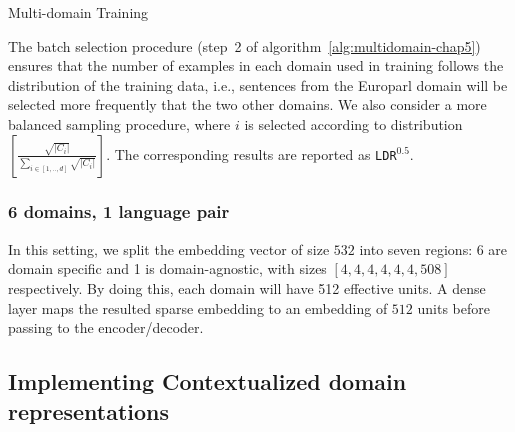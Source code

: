 \begin{algorithm}[h]
\caption{Multi-domain Training}
\label{alg:multidomain-chap5}
\begin{algorithmic}[1]
\REPEAT 
{}
\end{algorithmic}
\end{algorithm}
The batch selection procedure (step~2 of algorithm~\ref{alg:multidomain-chap5}) ensures that the number of examples in each domain used in training  follows the distribution of the training data, i.e., sentences from the Europarl domain will be selected more frequently that the two other domains. We also consider a more balanced sampling procedure, where $i$ is selected according to  distribution $[\frac{\sqrt{|C_i|}}{\sum_{i\in [1,..,d]}\sqrt{|C_i|}}]$. The corresponding results are reported as \texttt{LDR}$^{0.5}$.
\subsubsection{6 domains, 1 language pair}
\label{sssec:ldr6domain-chap5}
In this setting, we split the embedding vector of size $532$ into seven regions: 6 are domain specific and 1 is domain-agnostic, with sizes $[4,4,4,4,4,4,508]$ respectively. By doing this, each domain will have 512 effective units. A dense layer maps the resulted sparse  embedding to an embedding of $512$ units before passing to the encoder/decoder.

\subsection{Implementing Contextualized domain representations}
